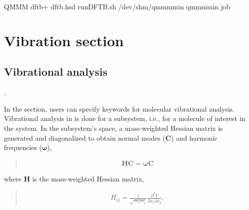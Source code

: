 \documentclass[a4paper,11pt,oneside,english]{sphinxmanual}
\begin{document}
\begin{sphinxVerbatim}[commandchars=\\\{\}]
\PYG{o}{[}QMMM\PYG{o}{]}
  
               dftb+
               dftb.hsd
               runDFTB.sh
             /dev/shm/qmmm\PYGZus{}min
             qmmm\PYGZus{}min
            job
       
\end{sphinxVerbatim}


\chapter{Vibration section}
\label{\detokenize{18_Vibration:vibration-section}}\label{\detokenize{18_Vibration:vibration}}\label{\detokenize{18_Vibration::doc}}

\section{Vibrational analysis}
\label{\detokenize{18_Vibration:vibrational-analysis}}
 .

In the \sphinxstylestrong{{[}VIBRATION{]}} section, users can specify keywords for molecular
vibrational analysis. Vibrational analysis in  is done
for a subsystem, i.e., for a molecule of interest in the system.
In the subsystem’s space, a mass-weighted Hessian matrix is
generated and diagonalized to obtain normal modes (\(\mathbf{C}\))
and harmonic frequencies (\(\mathbf{\omega}\)),
\begin{quote}
\begin{equation*}
\begin{split}\mathbf{H C} = \mathbf{\omega C}\end{split}
\end{equation*}\end{quote}

where \(\mathbf{H}\) is the mass-weighted Hessian matrix,
\begin{quote}
\begin{equation*}
\begin{split}H_{ij} = \frac{1}{\sqrt{m_i m_j}}\frac{\partial^2 V}{\partial x_i \partial x_j},\end{split}
\end{equation*}\end{quote}
\end{document}
